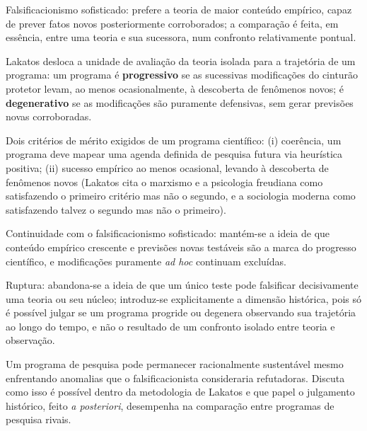 \documentclass[10pt]{extarticle}
\newcommand{\resposta}[1]{\par\smallskip\noindent #1}
\begin{document}
\begin{questoes}
\resposta{
\begin{topicos}
\item Falsificacionismo sofisticado: prefere a teoria de maior conteúdo empírico, capaz de prever fatos novos posteriormente corroborados; a comparação é feita, em essência, entre uma teoria e sua sucessora, num confronto relativamente pontual.
\item Lakatos desloca a unidade de avaliação da teoria isolada para a trajetória de um programa: um programa é \textbf{progressivo} se as sucessivas modificações do cinturão protetor levam, ao menos ocasionalmente, à descoberta de fenômenos novos; é \textbf{degenerativo} se as modificações são puramente defensivas, sem gerar previsões novas corroboradas.
\item Dois critérios de mérito exigidos de um programa científico: (i) coerência, um programa deve mapear uma agenda definida de pesquisa futura via heurística positiva; (ii) sucesso empírico ao menos ocasional, levando à descoberta de fenômenos novos (Lakatos cita o marxismo e a psicologia freudiana como satisfazendo o primeiro critério mas não o segundo, e a sociologia moderna como satisfazendo talvez o segundo mas não o primeiro).
\item Continuidade com o falsificacionismo sofisticado: mantém-se a ideia de que conteúdo empírico crescente e previsões novas testáveis são a marca do progresso científico, e modificações puramente \emph{ad hoc} continuam excluídas.
\item Ruptura: abandona-se a ideia de que um único teste pode falsificar decisivamente uma teoria ou seu núcleo; introduz-se explicitamente a dimensão histórica, pois só é possível julgar se um programa progride ou degenera observando sua trajetória ao longo do tempo, e não o resultado de um confronto isolado entre teoria e observação.
\end{topicos}
}

\item Um programa de pesquisa pode permanecer racionalmente sustentável mesmo enfrentando anomalias que o falsificacionista consideraria refutadoras. Discuta como isso é possível dentro da metodologia de Lakatos e que papel o julgamento histórico, feito \emph{a posteriori}, desempenha na comparação entre programas de pesquisa rivais.


\end{questoes}
\end{document}
